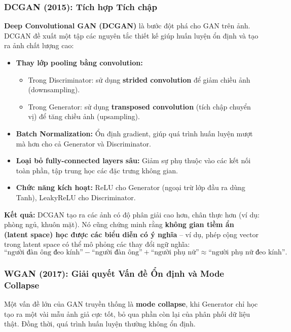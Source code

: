 \subsubsection{DCGAN (2015): Tích hợp Tích chập}
\label{subsubsec:dcgan}

\textbf{Deep Convolutional GAN (DCGAN)} \cite{Radford2015} là bước đột phá cho GAN trên ảnh. DCGAN đề xuất một tập các nguyên tắc thiết kế giúp huấn luyện ổn định và tạo ra ảnh chất lượng cao:

\begin{itemize}
	\item \textbf{Thay lớp pooling bằng convolution:}  
	\begin{itemize}
		\item Trong Discriminator: sử dụng \textbf{strided convolution} để giảm chiều ảnh (downsampling).  
		\item Trong Generator: sử dụng \textbf{transposed convolution} (tích chập chuyển vị) để tăng chiều ảnh (upsampling).
	\end{itemize}
	\item \textbf{Batch Normalization:} Ổn định gradient, giúp quá trình huấn luyện mượt mà hơn cho cả Generator và Discriminator.
	\item \textbf{Loại bỏ fully-connected layers sâu:} Giảm sự phụ thuộc vào các kết nối toàn phần, tập trung học các đặc trưng không gian.
	\item \textbf{Chức năng kích hoạt:} ReLU cho Generator (ngoại trừ lớp đầu ra dùng Tanh), LeakyReLU cho Discriminator.
\end{itemize}

\textbf{Kết quả:}  
DCGAN tạo ra các ảnh có độ phân giải cao hơn, chân thực hơn (ví dụ: phòng ngủ, khuôn mặt). Nó cũng chứng minh rằng \textbf{không gian tiềm ẩn (latent space) học được các biểu diễn có ý nghĩa} – ví dụ, phép cộng vector trong latent space có thể mô phỏng các thay đổi ngữ nghĩa:  
\[
\text{“người đàn ông đeo kính”} - \text{“người đàn ông”} + \text{“người phụ nữ”} \approx \text{“người phụ nữ đeo kính”}.
\]

\subsubsection{WGAN (2017): Giải quyết Vấn đề Ổn định và Mode Collapse}
\label{subsubsec:wgan}

Một vấn đề lớn của GAN truyền thống là \textbf{mode collapse}, khi Generator chỉ học tạo ra một vài mẫu ảnh giả cực tốt, bỏ qua phần còn lại của phân phối dữ liệu thật. Đồng thời, quá trình huấn luyện thường không ổn định.

